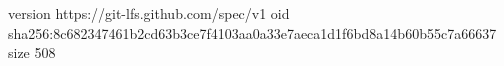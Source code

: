 version https://git-lfs.github.com/spec/v1
oid sha256:8c682347461b2cd63b3ce7f4103aa0a33e7aeca1d1f6bd8a14b60b55c7a66637
size 508
